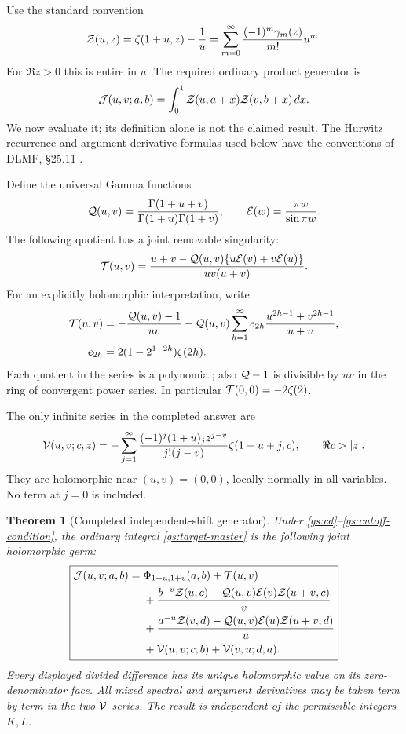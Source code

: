 \documentclass[11pt,letterpaper]{article}
\numberwithin{equation}{section}
\newtheorem{theorem}{Theorem}[section]
\theoremstyle{definition}
\theoremstyle{remark}
\begin{document}
Use the standard convention
\begin{equation}\label{gs:stieltjes-convention}
 \mathcal Z(u,z)=\zeta(1+u,z)-\frac1u
 =\sum_{m=0}^\infty\frac{(-1)^m\gamma_m(z)}{m!}u^m.
\end{equation}
For $\Re z>0$ this is entire in $u$.  The required ordinary product
generator is
\begin{equation}\label{gs:target-master}
 \mathcal J(u,v;a,b)=\int_0^1\mathcal Z(u,a+x)\mathcal Z(v,b+x)\,dx.
\end{equation}
We now evaluate it; its definition alone is not the claimed result.
The Hurwitz recurrence and argument-derivative formulas used below
have the conventions of DLMF, \S25.11 \cite{DLMF}.

Define the universal Gamma functions
\[
 \mathcal Q(u,v)=\frac{\Gamma(1+u+v)}{\Gamma(1+u)\Gamma(1+v)},
 \qquad \mathcal E(w)=\frac{\pi w}{\sin\pi w}.
\]
The following quotient has a joint removable singularity:
\begin{equation}\label{gs:universal-quotient}
 \mathcal T(u,v)=
 \frac{u+v-\mathcal Q(u,v)\{u\mathcal E(v)+v\mathcal E(u)\}}
 {uv(u+v)}.
\end{equation}
For an explicitly holomorphic interpretation, write
\begin{align}
 \mathcal T(u,v)&=-\frac{\mathcal Q(u,v)-1}{uv}
 -\mathcal Q(u,v)\sum_{h=1}^\infty e_{2h}
       \frac{u^{2h-1}+v^{2h-1}}{u+v},\label{gs:universal-holomorphic}\\
 e_{2h}&=2(1-2^{1-2h})\zeta(2h).
\end{align}
Each quotient in the series is a polynomial; also
$\mathcal Q-1$ is divisible by $uv$ in the ring of convergent power
series.  In particular $\mathcal T(0,0)=-2\zeta(2)$.

The only infinite series in the completed answer are
\begin{equation}\label{gs:V}
 \mathcal V(u,v;c,z)=
 -\sum_{j=1}^\infty
 \frac{(-1)^j(1+u)_j z^{j-v}}{j!(j-v)}
                    \zeta(1+u+j,c),\qquad \Re c>|z|.
\end{equation}
They are holomorphic near $(u,v)=(0,0)$, locally normally in all
variables.  No term at $j=0$ is included.

\begin{theorem}[Completed independent-shift generator]
\label{gs:completed}
Under \eqref{gs:cd}--\eqref{gs:cutoff-condition}, the ordinary integral
\eqref{gs:target-master} is the following joint holomorphic germ:
\begin{align}
 \boxed{\begin{aligned}
 \mathcal J(u,v;a,b)={}&\Phi_{1+u,1+v}(a,b)+\mathcal T(u,v)\\
 &+\frac{b^{-v}\mathcal Z(u,c)
       -\mathcal Q(u,v)\mathcal E(v)\mathcal Z(u+v,c)}{v}\\
 &+\frac{a^{-u}\mathcal Z(v,d)
       -\mathcal Q(u,v)\mathcal E(u)\mathcal Z(u+v,d)}{u}\\
 &+\mathcal V(u,v;c,b)+\mathcal V(v,u;d,a).
 \end{aligned}}
 \label{gs:completed-formula}
\end{align}
Every displayed divided difference has its unique holomorphic value
on its zero-denominator face.  All mixed spectral and argument
derivatives may be taken term by term in the two $\mathcal V$ series.
The result is independent of the permissible integers $K,L$.
\end{theorem}
\end{document}

